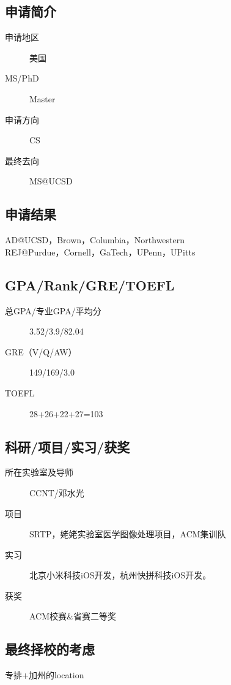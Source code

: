 \documentclass[11pt,fleqn,openany]{book} %
\begin{document}
\noindent\begin{minipage}[t]{0.45\textwidth}
\subsection*{申请简介}
\begin{description}
\item[申请地区] 美国
\item[MS/PhD] Master
\item[申请方向] CS
\item[最终去向] MS@UCSD
\end{description}
\end{minipage}
\hfill
\begin{minipage}[t]{0.45\textwidth}
\subsection*{申请结果}
\noindent AD@UCSD，Brown，Columbia，Northwestern\\
REJ@Purdue，Cornell，GaTech，UPenn，UPitts
\end{minipage}
\subsection*{GPA/Rank/GRE/TOEFL}
\begin{description}
\item[总GPA/专业GPA/平均分] 3.52/3.9/82.04
\item[GRE（V/Q/AW）] 149/169/3.0
\item[TOEFL] 28+26+22+27=103
\end{description}

\subsection*{科研/项目/实习/获奖}
\begin{description}
\item[所在实验室及导师] CCNT/邓水光
\item[项目] SRTP，姥姥实验室医学图像处理项目，ACM集训队
\item[实习] 北京小米科技iOS开发，杭州快拼科技iOS开发。
\item[获奖] ACM校赛\&省赛二等奖
\end{description}
\subsection*{最终择校的考虑}
专排+加州的location
\clearpage
\end{document}
